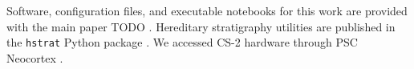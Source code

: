 Software, configuration files, and executable notebooks for this work are provided with the main paper TODO \citep{moreno2024trackable}.
Hereditary stratigraphy utilities are published in the \texttt{hstrat} Python package \citep{moreno2022hstrat}.
We accessed CS-2 hardware through PSC Neocortex \citep{buitrago2021neocortex}.


